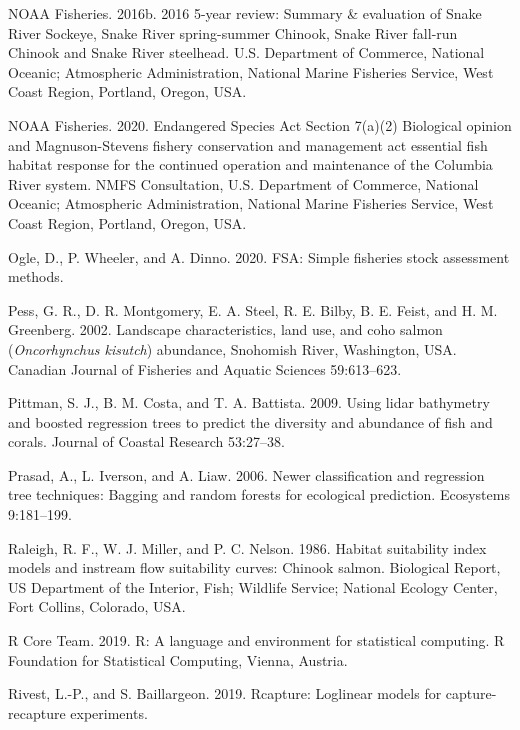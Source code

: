 \documentclass[
  12pt,
]{article}
\begin{document}
\leavevmode\hypertarget{ref-NOAA2016b}{}%
NOAA Fisheries. 2016b. 2016 5-year review: Summary \& evaluation of Snake River Sockeye, Snake River spring-summer Chinook, Snake River fall-run Chinook and Snake River steelhead. U.S. Department of Commerce, National Oceanic; Atmospheric Administration, National Marine Fisheries Service, West Coast Region, Portland, Oregon, USA.

\leavevmode\hypertarget{ref-NOAA2020}{}%
NOAA Fisheries. 2020. Endangered Species Act Section 7(a)(2) Biological opinion and Magnuson-Stevens fishery conservation and management act essential fish habitat response for the continued operation and maintenance of the Columbia River system. NMFS Consultation, U.S. Department of Commerce, National Oceanic; Atmospheric Administration, National Marine Fisheries Service, West Coast Region, Portland, Oregon, USA.

\leavevmode\hypertarget{ref-R-FSA}{}%
Ogle, D., P. Wheeler, and A. Dinno. 2020. FSA: Simple fisheries stock assessment methods.

\leavevmode\hypertarget{ref-Pess2002}{}%
Pess, G. R., D. R. Montgomery, E. A. Steel, R. E. Bilby, B. E. Feist, and H. M. Greenberg. 2002. Landscape characteristics, land use, and coho salmon (\emph{Oncorhynchus kisutch}) abundance, Snohomish River, Washington, USA. Canadian Journal of Fisheries and Aquatic Sciences 59:613--623.

\leavevmode\hypertarget{ref-Pittman2009}{}%
Pittman, S. J., B. M. Costa, and T. A. Battista. 2009. Using lidar bathymetry and boosted regression trees to predict the diversity and abundance of fish and corals. Journal of Coastal Research 53:27--38.

\leavevmode\hypertarget{ref-Prasad2006}{}%
Prasad, A., L. Iverson, and A. Liaw. 2006. Newer classification and regression tree techniques: Bagging and random forests for ecological prediction. Ecosystems 9:181--199.

\leavevmode\hypertarget{ref-Raleigh1986}{}%
Raleigh, R. F., W. J. Miller, and P. C. Nelson. 1986. Habitat suitability index models and instream flow suitability curves: Chinook salmon. Biological Report, US Department of the Interior, Fish; Wildlife Service; National Ecology Center, Fort Collins, Colorado, USA.

\leavevmode\hypertarget{ref-Rsoftware2019}{}%
R Core Team. 2019. R: A language and environment for statistical computing. R Foundation for Statistical Computing, Vienna, Austria.

\leavevmode\hypertarget{ref-R-Rcapture}{}%
Rivest, L.-P., and S. Baillargeon. 2019. Rcapture: Loglinear models for capture-recapture experiments.
\end{document}
